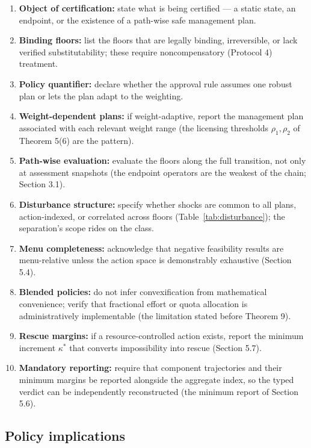 \documentclass[3p,11pt]{elsarticle}
\providecommand{\tightlist}{\setlength{\itemsep}{0pt}\setlength{\parskip}{0pt}}
\begin{document}
\begin{enumerate}
\tightlist
\item
  \textbf{Object of certification:} state what is being certified --- a
  static state, an endpoint, or the existence of a path-wise safe
  management plan.
\item
  \textbf{Binding floors:} list the floors that are legally binding,
  irreversible, or lack verified substitutability; these require
  noncompensatory (Protocol 4) treatment.
\item
  \textbf{Policy quantifier:} declare whether the approval rule assumes
  one robust plan or lets the plan adapt to the weighting.
\item
  \textbf{Weight-dependent plans:} if weight-adaptive, report the
  management plan associated with each relevant weight range (the
  licensing thresholds \(\rho_1, \rho_2\) of Theorem 5(6) are the
  pattern).
\item
  \textbf{Path-wise evaluation:} evaluate the floors along the full
  transition, not only at assessment snapshots (the endpoint operators
  are the weakest of the chain; Section 3.1).
\item
  \textbf{Disturbance structure:} specify whether shocks are common to
  all plans, action-indexed, or correlated across floors
  (Table~\ref{tab:disturbance}); the separation's scope rides on the
  class.
\item
  \textbf{Menu completeness:} acknowledge that negative feasibility
  results are menu-relative unless the action space is demonstrably
  exhaustive (Section 5.4).
\item
  \textbf{Blended policies:} do not infer convexification from
  mathematical convenience; verify that fractional effort or quota
  allocation is administratively implementable (the limitation stated
  before Theorem 9).
\item
  \textbf{Rescue margins:} if a resource-controlled action exists, report
  the minimum increment \(\kappa^*\) that converts impossibility into
  rescue (Section 5.7).
\item
  \textbf{Mandatory reporting:} require that component trajectories and
  their minimum margins be reported alongside the aggregate index, so the
  typed verdict can be independently reconstructed (the minimum report of
  Section 5.6).
\end{enumerate}

\subsection{Policy implications}\label{policy-implications}
\end{document}
